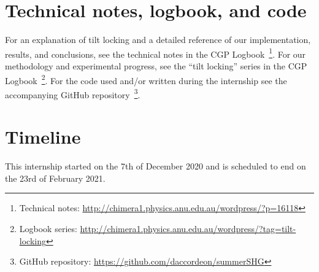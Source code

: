 \documentclass[aps,pra,superscriptaddress,reprint,nofootinbib]{revtex4-1}
\begin{document}
\appendix
\section{Technical notes, logbook, and code}

For an explanation of tilt locking and a detailed reference of our implementation, results, and conclusions, see the technical notes in the CGP Logbook~\footnote{Technical notes: \url{http://chimera1.physics.anu.edu.au/wordpress/?p=16118}}. For our methodology and experimental progress, see the ``tilt locking'' series in the CGP Logbook~\footnote{Logbook series: \url{http://chimera1.physics.anu.edu.au/wordpress/?tag=tilt-locking}}.
For the code used and/or written during the internship see the accompanying GitHub repository~\footnote{GitHub repository: \url{https://github.com/daccordeon/summerSHG}}.

\section{Timeline}

This internship started on the 7th of December 2020 and is scheduled to end on the 23rd of February 2021.
\end{document}
